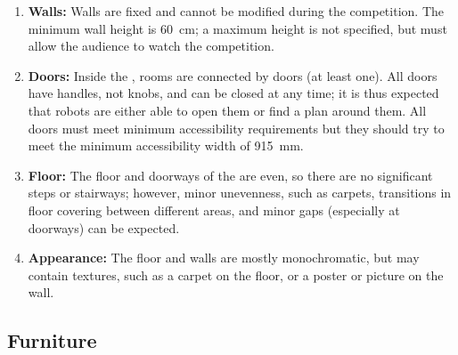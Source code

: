 \begin{enumerate}
	\item \textbf{Walls:} Walls are fixed and cannot be modified during the competition. The minimum wall height is \SI{60}{\centi\meter}; a maximum height is not specified, but must allow the audience to watch the competition.
	\item \textbf{Doors:} Inside the \Arena{}, rooms are connected by doors (at least one). All doors have handles, not knobs, and can be closed at any time; it is thus expected that robots are either able to open them or find a plan around them. All doors must meet minimum accessibility requirements but they should try to meet the minimum accessibility width of \SI{915}{\milli\meter}.
	\item \textbf{Floor:} The floor and doorways of the \Arena{} are even, so there are no significant steps or stairways; however, minor unevenness, such as carpets, transitions in floor covering between different areas, and minor gaps (especially at doorways) can be expected.
	\item \textbf{Appearance:} The floor and walls are mostly monochromatic, but may contain textures, such as a carpet on the floor, or a poster or picture on the wall.
\end{enumerate}


\subsection{Furniture}\label{rule:scenario_furniture}

